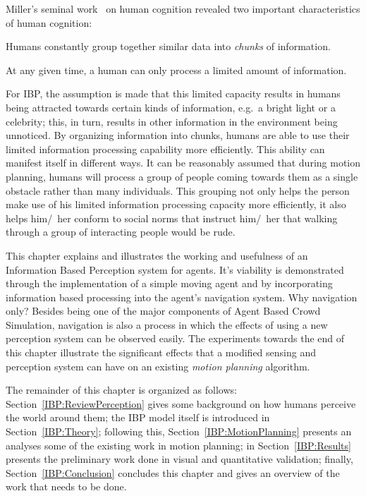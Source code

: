 Miller's seminal work~\cite{Miller:1956tr} on human cognition revealed two important characteristics of human cognition:
\begin{inparaenum}
\item Humans constantly group together similar data into \emph{chunks} of information.
\item At any given time, a human can only process a limited amount of information.
\end{inparaenum}
For IBP, the assumption is made that this limited capacity results in humans being attracted towards certain kinds of information, e.g.\ a bright light or a celebrity; this, in turn, results in other information in the environment being unnoticed. By organizing information into chunks, humans are able to use their limited information processing capability more efficiently. This ability can manifest itself in different ways. It can be reasonably assumed that during motion planning, humans will process a group of people coming towards them as a single obstacle rather than many individuals. This grouping not only helps the person make use of his limited information processing capacity more efficiently,  it also helps him/~her conform to social norms that instruct him/~her that walking through a group of interacting people would be rude.


This chapter explains and illustrates the working and usefulness of an Information Based Perception system for agents. It's viability is demonstrated through the implementation of a simple moving agent and by incorporating information based processing into the agent's navigation system. Why navigation only? Besides being one of the major components of Agent Based Crowd Simulation, navigation is also a process in which the effects of using a new perception system can be observed easily. The experiments towards the end of this chapter illustrate the significant effects that a modified sensing and perception system can have on an existing \emph{motion planning} algorithm.

The remainder of this chapter is organized as follows: Section~\ref{IBP:ReviewPerception} gives some background on how humans perceive the world around them; the IBP model itself is introduced in Section~\ref{IBP:Theory}; following this, Section~\ref{IBP:MotionPlanning} presents an analyses some of the existing work in motion planning; in Section~\ref{IBP:Results} presents the preliminary work done in visual and quantitative validation; finally, Section~\ref{IBP:Conclusion} concludes this chapter and gives an overview of the work that needs to be done.


